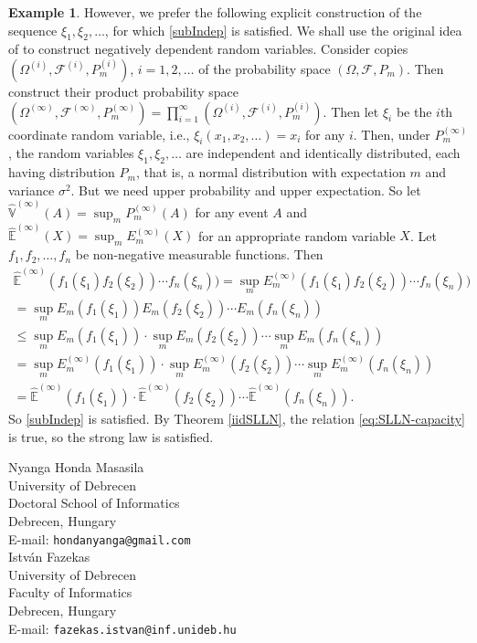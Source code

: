 \documentclass[12pt]{article}
\theoremstyle{definition}
\newtheorem{example}[theorem]{Example}
\theoremstyle{remark}
\numberwithin{equation}{section}
\def\Eh{{\hat{\mathbb{E}}}}
\def\Vh{{\hat{\mathbb{V}}}}
\def\FD{{\mathcal F}}                     \def\GD{{\cal G}}
\begin{document}
\begin{example}
However, we prefer the following explicit construction of the sequence $\xi_1, \xi_2, \dots $, for which 
\eqref{subIndep} is satisfied. We shall use the original idea of \cite{Huber1973} to construct negatively dependent random variables.
Consider copies $(\Omega^{(i)}, \FD^{(i)}, P_m^{(i)})$, $i=1,2,\dots$ of the probability space $(\Omega, \FD, P_m)$.
Then construct their product probability space 
$(\Omega^{(\infty)}, \FD^{(\infty)}, P_m^{(\infty)}) = \prod_{i=1}^\infty(\Omega^{(i)}, \FD^{(i)}, P_m^{(i)})$.
Then let 
$\xi_i$ be the $i$th coordinate random variable, i.e.,
$\xi_i(x_1, x_2, \dots ) = x_i$ for any $i$.
Then, under $P_m^{(\infty)}$, the random variables $\xi_1, \xi_2, \dots $ are independent and identically distributed,
each having distribution $P_m$, that is, a normal distribution with expectation $m$ and variance $\sigma^2$.
But we need upper probability and upper expectation.
So let $\Vh^{(\infty)}(A) =\sup_m P_m^{(\infty)}(A)$ for any event $A$ and
$\Eh^{(\infty)}(X) =\sup_m E_m^{(\infty)}(X)$ for an appropriate random variable $X$.
Let $f_1, f_2, \dots ,f_n$ be non-negative measurable functions.
Then
\begin{eqnarray*}
\Eh^{(\infty)}(f_1(\xi_1) f_2(\xi_2)) \cdots f_n(\xi_n)) =
\sup_m E_m^{(\infty)} (f_1(\xi_1) f_2(\xi_2)) \cdots f_n(\xi_n)) \\
= \sup_m E_m(f_1(\xi_1)) E_m (f_2(\xi_2)) \cdots E_m (f_n(\xi_n))  \\
\le
\sup_m E_m(f_1(\xi_1)) \cdot \sup_m E_m (f_2(\xi_2)) \cdots \sup_m E_m (f_n(\xi_n))\\
=
\sup_m E_m^{(\infty)}(f_1(\xi_1)) \cdot \sup_m E_m^{(\infty)} (f_2(\xi_2)) \cdots \sup_m E_m^{(\infty)} (f_n(\xi_n)) \\
=
\Eh^{(\infty)}(f_1(\xi_1)) \cdot \Eh^{(\infty)}( f_2(\xi_2)) \cdots \Eh^{(\infty)} (f_n(\xi_n)) .
\end{eqnarray*}
So \eqref{subIndep} is satisfied.
By Theorem \ref{iidSLLN}, the relation \eqref{eq:SLLN-capacity} is true, so the strong law is satisfied.
\end{example}




\printbibliography
\bigskip
\noindent Nyanga Honda Masasila \\
University of Debrecen \\
Doctoral School of Informatics \\
Debrecen, Hungary \\
E-mail: \texttt{hondanyanga@gmail.com} \\

\bigskip
\noindent Istv\'an Fazekas \\
University of Debrecen \\
Faculty of Informatics\\
Debrecen, Hungary \\
E-mail: \texttt{fazekas.istvan@inf.unideb.hu} \\
\bigskip
\end{document}
